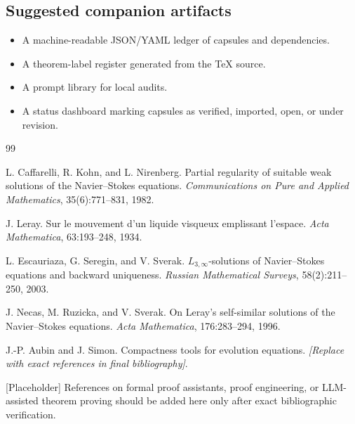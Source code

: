 \documentclass[11pt]{article}
\theoremstyle{plain}
\theoremstyle{definition}
\theoremstyle{remark}
\begin{document}
\subsection{Suggested companion artifacts}
\begin{itemize}
  \item A machine-readable JSON/YAML ledger of capsules and dependencies.
  \item A theorem-label register generated from the TeX source.
  \item A prompt library for local audits.
  \item A status dashboard marking capsules as verified, imported, open, or under revision.
\end{itemize}

\begin{thebibliography}{99}

L. Caffarelli, R. Kohn, and L. Nirenberg.
Partial regularity of suitable weak solutions of the Navier--Stokes equations.
\emph{Communications on Pure and Applied Mathematics}, 35(6):771--831, 1982.

J. Leray.
Sur le mouvement d'un liquide visqueux emplissant l'espace.
\emph{Acta Mathematica}, 63:193--248, 1934.

L. Escauriaza, G. Seregin, and V. Sverak.
$L_{3,\infty}$-solutions of Navier--Stokes equations and backward uniqueness.
\emph{Russian Mathematical Surveys}, 58(2):211--250, 2003.

J. Necas, M. Ruzicka, and V. Sverak.
On Leray's self-similar solutions of the Navier--Stokes equations.
\emph{Acta Mathematica}, 176:283--294, 1996.

J.-P. Aubin and J. Simon.
Compactness tools for evolution equations.
\emph{[Replace with exact references in final bibliography]}.

[Placeholder]
References on formal proof assistants, proof engineering, or LLM-assisted theorem proving should be added here only after exact bibliographic verification.

\end{thebibliography}
\end{document}
